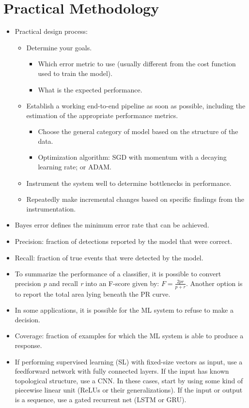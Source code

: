 \documentclass{article}
\begin{document}
\section{Practical Methodology}
\begin{itemize}
\item Practical design process:
\begin{itemize}
\item Determine your goals.
\begin{itemize}
\item Which error metric to use (usually different from the cost function used to train the model).
\item What is the expected performance.
\end{itemize}
\item Establish a working end-to-end pipeline as soon as possible, including the estimation of the appropriate performance metrics.
\begin{itemize}
\item Choose the general category of model based on the structure of the data.
\item Optimization algorithm: SGD with momentum with a decaying learning rate; or ADAM.
\end{itemize}
\item Instrument the system well to determine bottlenecks in performance.
\item Repeatedly make incremental changes based on specific findings from the instrumentation.
\end{itemize}
\item Bayes error defines the minimum error rate that can be achieved.
\item Precision: fraction of detections reported by the model that were correct.
\item Recall: fraction of true events that were detected by the model.
\item To summarize the performance of a classifier, it is possible to convert precision \textit{p} and recall \textit{r} into an F-score given by: \(F = \frac{2pr}{p + r}\). Another option is to report the total area lying beneath the PR curve.
\item In some applications, it is possible for the ML system to refuse to make a decision.
\item Coverage: fraction of examples for which the ML system is able to produce a response.
\item  If performing supervised learning (SL) with fixed-size vectors as input, use a feedforward network with fully connected layers. If the input has known topological structure, use a CNN. In these cases, start by using some kind of piecewise linear unit (ReLUs or their generalizations). If the input or output is a sequence, use a gated recurrent net (LSTM or GRU).

\end{itemize}
\end{document}
